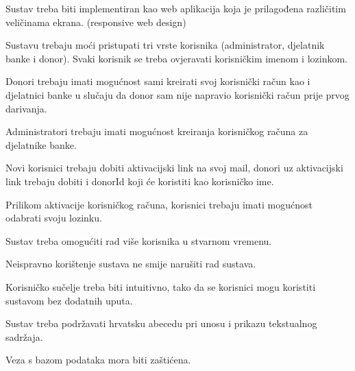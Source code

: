 \begin{packed_item}
	
	\item Sustav treba biti implementiran kao web aplikacija koja je prilagođena različitim veličinama ekrana. (responsive web design)
	\item Sustavu trebaju moći pristupati tri vrste korisnika (administrator, djelatnik banke i donor). Svaki korisnik se treba ovjeravati korisničkim imenom i lozinkom.
	\item Donori trebaju imati mogućnost sami kreirati svoj korisnički račun kao i djelatnici banke u slučaju da donor sam nije napravio korisnički račun prije prvog darivanja.
	\item Administratori trebaju imati mogućnost kreiranja korisničkog računa za djelatnike banke.
	\item Novi korisnici trebaju dobiti aktivacijski link na svoj mail, donori uz aktivacijski link trebaju dobiti i donorId koji će koristiti kao korisničko ime.
	\item Prilikom aktivacije korisničkog računa, korisnici trebaju imati mogućnost odabrati svoju lozinku.
	\item Sustav treba omogućiti rad više korisnika u stvarnom vremenu.
	\item Neispravno korištenje sustava ne smije narušiti rad sustava.
	\item Korisničko sučelje treba biti intuitivno, tako da se korisnici mogu koristiti sustavom bez dodatnih uputa.
	\item Sustav treba podržavati hrvatsku abecedu pri unosu i prikazu tekstualnog sadržaja.
	\item Veza s bazom podataka mora biti zaštićena.

\end{packed_item}






